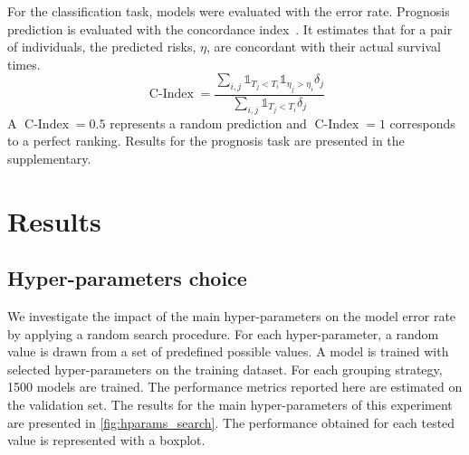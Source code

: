\documentclass[../main.tex]{subfiles}
\begin{document}
	 For the classification task, models were evaluated with the error rate.
	 Prognosis prediction is evaluated with the concordance index~\cite{harrellMultivariablePrognosticModels1996}.
	 It estimates that for a pair of individuals, the predicted risks, $\eta$,  are concordant with their actual survival times.
	 \[ \operatorname{C-Index} = \frac{\sum_{i,j}\mathbb{1}_{T_j < T_i}\mathbb{1}_{\eta_j > \eta_i}\delta_j}{\sum_{i,j}\mathbb{1}_{T_j < T_i}\delta_j} \]
	 A $\operatorname{C-Index} = 0.5$ represents a random prediction and $\operatorname{C-Index} = 1$ corresponds to a perfect ranking.
	 Results for the prognosis task are presented in the supplementary.

\section{Results}

 \subsection{Hyper-parameters choice}

	 We investigate the impact of the main hyper-parameters on the model error rate by applying a random search procedure.
	 For each hyper-parameter, a random value is drawn from a set of predefined possible values.
	 A model is trained with selected hyper-parameters on the training dataset.
	 For each grouping strategy, 1500 models are trained.
	 The performance metrics reported here are estimated on the validation set.
	 The results for the main hyper-parameters of this experiment are presented in \cref{fig:hparams_search}.
	 The performance obtained for each tested value is represented with a boxplot.
\end{document}
